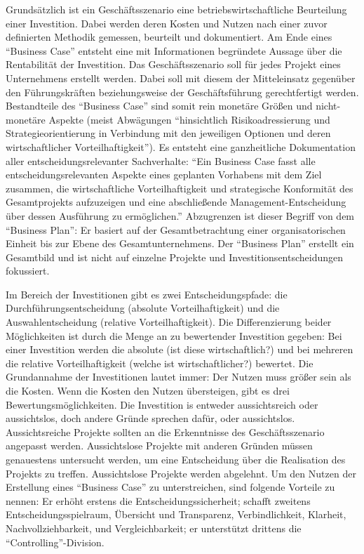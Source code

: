 Grundsätzlich ist ein Geschäftsszenario eine betriebswirtschaftliche Beurteilung einer Investition. Dabei werden deren Kosten und Nutzen nach einer zuvor definierten Methodik gemessen, beurteilt und dokumentiert. Am Ende eines \enquote{Business Case} entsteht eine mit Informationen begründete Aussage über die Rentabilität der Investition. Das Geschäftsszenario soll für jedes Projekt eines Unternehmens erstellt werden. Dabei soll mit diesem der Mitteleinsatz gegenüber den Führungskräften beziehungsweise der Geschäftsführung gerechtfertigt werden. Bestandteile des \enquote{Business Case} sind somit rein monetäre Größen und nicht-monetäre Aspekte (meist Abwägungen \enquote{hinsichtlich Risikoadressierung und Strategieorientierung in Verbindung mit den jeweiligen Optionen und deren wirtschaftlicher Vorteilhaftigkeit}\autocite[][S.\,12]{brugger_it_2009}). Es entsteht eine ganzheitliche Dokumentation aller entscheidungsrelevanter Sachverhalte: \enquote{Ein Business Case fasst alle entscheidungsrelevanten Aspekte eines geplanten Vorhabens mit dem Ziel zusammen, die wirtschaftliche Vorteilhaftigkeit und strategische Konformität des Gesamtprojekts aufzuzeigen und eine abschließende Management-Entscheidung über dessen Ausführung zu ermöglichen.}\autocite[][S.\,13]{brugger_it_2009} Abzugrenzen ist dieser Begriff von dem \enquote{Business Plan}: Er basiert auf der Gesamtbetrachtung einer organisatorischen Einheit bis zur Ebene des Gesamtunternehmens. Der \enquote{Business Plan} erstellt ein Gesamtbild und ist nicht auf einzelne Projekte und Investitionsentscheidungen fokussiert. 
\par
Im Bereich der Investitionen gibt es zwei Entscheidungspfade: die Durchführungsentscheidung (absolute Vorteilhaftigkeit) und die Auswahlentscheidung (relative Vorteilhaftigkeit).\autocite[vgl.][S.\,14]{brugger_it_2009} Die Differenzierung beider Möglichkeiten ist durch die Menge an zu bewertender Investition gegeben: Bei einer Investition werden die absolute (ist diese wirtschaftlich?) und bei mehreren die relative Vorteilhaftigkeit (welche ist wirtschaftlicher?) bewertet. Die Grundannahme der Investitionen lautet immer: Der Nutzen muss größer sein als die Kosten. Wenn die Kosten den Nutzen übersteigen, gibt es drei Bewertungsmöglichkeiten. Die Investition is entweder aussichtsreich oder aussichtslos, doch andere Gründe sprechen dafür, oder aussichtslos. Aussichtsreiche Projekte sollten an die Erkenntnisse des Geschäftsszenario angepasst werden. Aussichtslose Projekte mit anderen Gründen müssen genauestens untersucht werden, um eine Entscheidung über die Realisation des Projekts zu treffen. Aussichtslose Projekte werden abgelehnt. Um den Nutzen der Erstellung eines \enquote{Business Case} zu unterstreichen, sind folgende Vorteile zu nennen: Er erhöht erstens die Entscheidungssicherheit; schafft zweitens Entscheidungsspielraum, Übersicht und Transparenz, Verbindlichkeit, Klarheit, Nachvollziehbarkeit, und Vergleichbarkeit; er unterstützt drittens die \enquote{Controlling}-Division.\autocite[vgl.][S.\,17]{brugger_it_2009} \par
